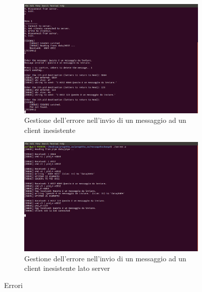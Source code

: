 \documentclass[a4paper]{article}
\begin{document}
\begin{figure}
\centering
\begin{subfigure}[b]{0.8\textwidth}
\includegraphics[width=\textwidth]{screenmsg/11_client_6932}
\caption{Gestione dell'errore nell'invio di un messaggio ad un client inesistente}
\end{subfigure}
\begin{subfigure}[b]{0.8\textwidth}
\includegraphics[width=\textwidth]{screenmsg/12_server}
\caption{Gestione dell'errore nell'invio di un messaggio ad un client inesistente lato server}
\end{subfigure}
\caption{Errori}
\end{figure}
\end{document}

